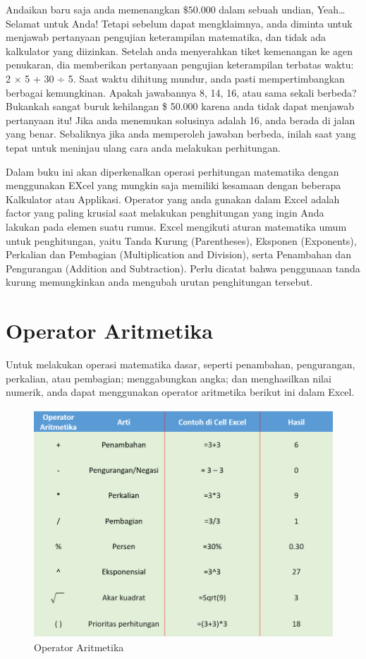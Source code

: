\documentclass[
]{book}
\begin{document}
Andaikan baru saja anda memenangkan \(\$ 50.000\) dalam sebuah undian, Yeah\ldots{} Selamat untuk Anda! Tetapi sebelum dapat mengklaimnya, anda diminta untuk menjawab pertanyaan pengujian keterampilan matematika, dan tidak ada kalkulator yang diizinkan. Setelah anda menyerahkan tiket kemenangan ke agen penukaran, dia memberikan pertanyaan pengujian keterampilan terbatas waktu: 2 × 5 + 30 ÷ 5. Saat waktu dihitung mundur, anda pasti mempertimbangkan berbagai kemungkinan. Apakah jawabannya 8, 14, 16, atau sama sekali berbeda? Bukankah sangat buruk kehilangan \$ 50.000 karena anda tidak dapat menjawab pertanyaan itu! Jika anda menemukan solusinya adalah 16, anda berada di jalan yang benar. Sebaliknya jika anda memperoleh jawaban berbeda, inilah saat yang tepat untuk meninjau ulang cara anda melakukan perhitungan.

Dalam buku ini akan diperkenalkan operasi perhitungan matematika dengan menggunakan EXcel yang mungkin saja memiliki kesamaan dengan beberapa Kalkulator atau Applikasi. Operator yang anda gunakan dalam Excel adalah factor yang paling krusial saat melakukan penghitungan yang ingin Anda lakukan pada elemen suatu rumus. Excel mengikuti aturan matematika umum untuk penghitungan, yaitu Tanda Kurung (Parentheses), Eksponen (Exponents), Perkalian dan Pembagian (Multiplication and Division), serta Penambahan dan Pengurangan (Addition and Subtraction). Perlu dicatat bahwa penggunaan tanda kurung memungkinkan anda mengubah urutan penghitungan tersebut.

\hypertarget{operator-aritmetika}{%
\section{Operator Aritmetika}\label{operator-aritmetika}}

Untuk melakukan operasi matematika dasar, seperti penambahan, pengurangan, perkalian, atau pembagian; menggabungkan angka; dan menghasilkan nilai numerik, anda dapat menggunakan operator aritmetika berikut ini dalam Excel.

\begin{figure}

{\centering \includegraphics[width=0.75\linewidth]{images/aritmatika} 

}

\caption{Operator Aritmetika}\label{fig:aritmatika}
\end{figure}
\end{document}
